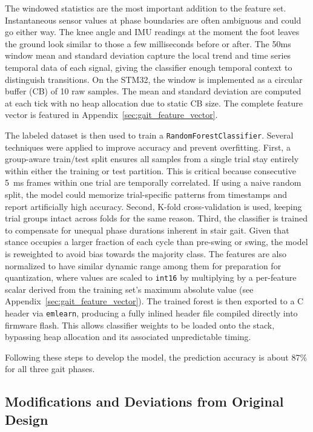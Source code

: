 \documentclass[11pt]{article}
\begin{document}
The windowed statistics are the most important addition to the feature set. 
Instantaneous sensor values at phase boundaries are often ambiguous and could go either way. 
The knee angle and IMU readings at the moment the foot leaves the ground look similar to those a few milliseconds before or after. 
The 50ms window mean and standard deviation capture the local trend and time series temporal data of each signal, giving the classifier enough temporal context to distinguish transitions. 
On the STM32, the window is implemented as a circular buffer (CB) of 10 raw samples. The mean and standard deviation are computed at each tick with no heap allocation due to static CB size. 
The complete feature vector is featured in Appendix~\ref{sec:gait_feature_vector}.

The labeled dataset is then used to train a \verb|RandomForestClassifier|.
Several techniques were applied to improve accuracy and prevent overfitting.
First, a group-aware train/test split ensures all samples from a single trial stay entirely within either the training or test partition.
This is critical because consecutive 5~ms frames within one trial are temporally correlated. If using a naive random split, the model could memorize trial-specific patterns from timestamps and report artificially high accuracy.
Second, K-fold cross-validation is used, keeping trial groups intact across folds for the same reason.
Third, the classifier is trained to compensate for unequal phase durations inherent in stair gait.
Given that stance occupies a larger fraction of each cycle than pre-swing or swing, the model is reweighted to avoid bias towards the majority class.
The features are also normalized to have similar dynamic range among them for preparation for quantization, where values are scaled to \texttt{int16} by multiplying by a per-feature scalar derived from the training set's maximum absolute value (see Appendix~\ref{sec:gait_feature_vector}).
The trained forest is then exported to a C header via \verb|emlearn|, producing a fully inlined header file compiled directly into firmware flash.
This allows classifier weights to be loaded onto the stack, bypassing heap allocation and its associated unpredictable timing.

Following these steps to develop the model, the prediction accuracy is about 87\% for all three gait phases.

\subsection{Modifications and Deviations from Original Design}
\end{document}
